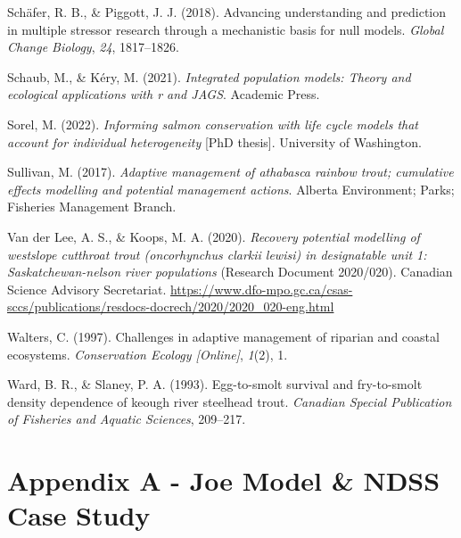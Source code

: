 \documentclass[
  letterpaper,
  DIV=11,
  numbers=noendperiod]{scrreprt}
\newlength{\cslhangindent}
\newenvironment{CSLReferences}[2] %
 {\begin{list}{}{%
  \setlength{\itemindent}{0pt}
  \setlength{\leftmargin}{0pt}
  \setlength{\parsep}{0pt}
  \ifodd #1
   \setlength{\leftmargin}{\cslhangindent}
   \setlength{\itemindent}{-1\cslhangindent}
  \fi
  \setlength{\itemsep}{#2\baselineskip}}}
 {\end{list}}
\begin{document}
\begin{CSLReferences}{1}{0}
Schäfer, R. B., \& Piggott, J. J. (2018). Advancing understanding and
prediction in multiple stressor research through a mechanistic basis for
null models. \emph{Global Change Biology}, \emph{24}, 1817--1826.

Schaub, M., \& Kéry, M. (2021). \emph{Integrated population models:
Theory and ecological applications with r and JAGS}. Academic Press.

Sorel, M. (2022). \emph{Informing salmon conservation with life cycle
models that account for individual heterogeneity} {[}PhD thesis{]}.
University of Washington.

Sullivan, M. (2017). \emph{Adaptive management of athabasca rainbow
trout; cumulative effects modelling and potential management actions}.
Alberta Environment; Parks; Fisheries Management Branch.

Van der Lee, A. S., \& Koops, M. A. (2020). \emph{Recovery potential
modelling of westslope cutthroat trout (oncorhynchus clarkii lewisi) in
designatable unit 1: Saskatchewan-nelson river populations} (Research
Document 2020/020). Canadian Science Advisory Secretariat.
\url{https://www.dfo-mpo.gc.ca/csas-sccs/publications/resdocs-docrech/2020/2020_020-eng.html}

Walters, C. (1997). Challenges in adaptive management of riparian and
coastal ecosystems. \emph{Conservation Ecology {[}Online{]}},
\emph{1}(2), 1.

Ward, B. R., \& Slaney, P. A. (1993). Egg-to-smolt survival and
fry-to-smolt density dependence of keough river steelhead trout.
\emph{Canadian Special Publication of Fisheries and Aquatic Sciences},
209--217.

\end{CSLReferences}

\cleardoublepage
{}
{}
\appendix

\chapter*{Appendix A - Joe Model \& NDSS Case
Study}\label{appendix-a---joe-model-ndss-case-study}
\end{document}

